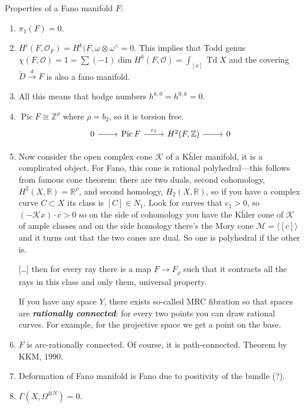 \documentclass{article}
\numberwithin{equation}{section}
\newcommand{\R}{\mathbb{R}}
\newcommand{\Z}{\mathbb{Z}}
\newcommand{\Kc}{\mathcal{K}}
\newcommand{\Mc}{\mathcal{M}}
\newcommand{\Oc}{\mathcal{O}}
\DeclareMathOperator{\Td}{Td}
\DeclareMathOperator{\Pic}{Pic}
\begin{document}
	Properties of a Fano manifold $F$:
	\begin{enumerate}
		\item $\pi_1(F)=0$.
		\item $H^i(F,\Oc_F)=H^k(F,\omega\otimes\omega^\wedge=0$. This implies that Todd genus $\chi(F,\Oc)=1=\sum(-1)\dim H^k(F,\Oc)=\int_{[x]}\Td X$ and the covering $\tilde{D}\overset{d}{\to} F$ is also a fano manifold.
		\item All this means that hodge numbers $h^{k,0}=h^{0,k}=0$.
		\item $\Pic F\cong \Z^\rho$ where $\rho=b_2$, so it is torsion free.
		\[\begin{tikzcd}
			0\arrow[r]&\Pic F\arrow[r,"c_1"]&H^2(F,\Z)\arrow[r]&0
		\end{tikzcd}\]
		\item Now consider the open complex cone $\Kc$ of a K\"hler manifold, it is a complicated object. For Fano, this cone is rational polyhedral---this follows from famous cone theorem: there are two duals, second cohomology, $H^2(X,\R)=\R^\rho$, and second homology, $H_2(X,\R)$, so if you have a complex curve $C\subset X$ its class is $[C]\in N_1$. Look for curves that $c_1>0$, so $(-\Kc x)\cdot c>0$ so on the side of cohomology you have the K\"hler cone of $\Kc$ of ample classes  and on the side homology there's the Mory cone $\Mc=\langle[c]\rangle$ and it turns out that the two cones are dual. So one is polyhedral if the other is.
		
		[…] then for every ray there is a map $F\to F_\rho$ such that it contracts all the rays in this class and only them, universal property.
		
		If you have any space $Y$, there exists so-called MRC fibration so that spaces are \textbf{\textit{rationally connected}}: for every two points you can draw rational curves. For example, for the projective space we get a point on the base.
		
		\item $F$ is arc-rationally connected. Of course, it is path-connected. Theorem by KKM, 1990.
		
		\item Deformation of Fano manifold is Fano due to positivity of the bundle (?).
		
		\item $\Gamma(X,\Omega^{\otimes N})=0$.
	\end{enumerate}
	
\end{document}
